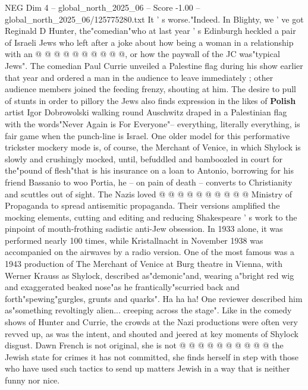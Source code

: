 \begin{textsample}{NEG Dim 4 – global\_north\_2025\_06 – Score -1.00 – global\_north\_2025\_06/125775280.txt}
It ' s worse."Indeed.
In Blighty, we ' ve got Reginald D Hunter, the"comedian"who at last year ' s Edinburgh heckled a pair of Israeli Jews who left after a joke about how being a woman in a relationship with an @ @ @ @ @ @ @ @ @ @, or how the paywall of the JC was"typical Jews".
The comedian Paul Currie unveiled a Palestine flag during his show earlier that year and ordered a man in the audience to leave immediately ; other audience members joined the feeding frenzy, shouting at him.
The desire to pull of stunts in order to pillory the Jews also finds expression in the likes of \textbf{Polish} artist Igor Dobrowolski walking round Auschwitz draped in a Palestinian flag with the words"Never Again is For Everyone"-- everything, literally everything, is fair game when the punch-line is Israel.
One older model for this performative trickster mockery mode is, of course, the Merchant of Venice, in which Shylock is slowly and crushingly mocked, until, befuddled and bamboozled in court for the"pound of flesh"that is his insurance on a loan to Antonio, borrowing for his friend Bassanio to woo Portia, he -- on pain of death -- converts to Christianity and scuttles out of sight.
The Nazis loved @ @ @ @ @ @ @ @ @ @ Ministry of Propaganda to spread antisemitic propaganda.
Their versions amplified the mocking elements, cutting and editing and reducing Shakespeare ' s work to the pinpoint of mouth-frothing sadistic anti-Jew obsession.
In 1933 alone, it was performed nearly 100 times, while Kristallnacht in November 1938 was accompanied on the airwaves by a radio version.
One of the most famous was a 1943 production of The Merchant of Venice at Burg theatre in Vienna, with Werner Krauss as Shylock, described as"demonic"and, wearing a"bright red wig and exaggerated beaked nose"as he frantically"scurried back and forth"spewing"gurgles, grunts and quarks".
Ha ha ha!
One reviewer described him as"something revoltingly alien... creeping across the stage".
Like in the comedy shows of Hunter and Currie, the crowds at the Nazi productions were often very revved up, as was the intent, and shouted and jeered at key moments of Shylock disgust.
Dawn French is not original, she is not @ @ @ @ @ @ @ @ @ @ the Jewish state for crimes it has not committed, she finds herself in step with those who have used such tactics to send up matters Jewish in a way that is neither funny nor nice.

\end{textsample}

